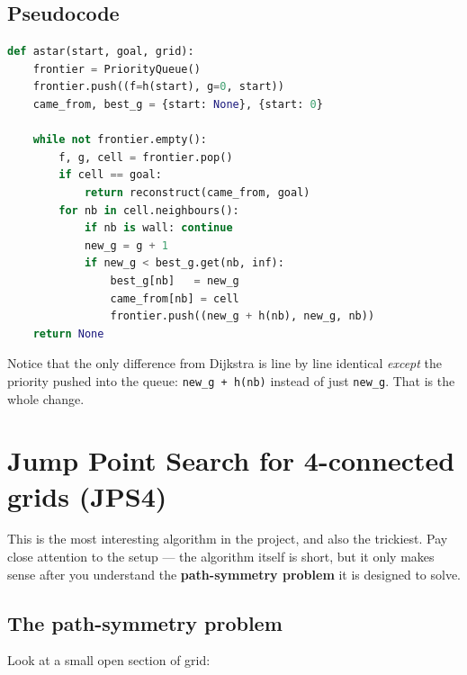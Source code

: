\documentclass[11pt,a4paper]{article}
\newcommand{\gridbase}[2]{%
  \draw[step=0.6,gray!50,very thin] (0,0) grid (#1*0.6,#2*0.6);
  \draw[black,thick] (0,0) rectangle (#1*0.6,#2*0.6);
}
\newcommand{\fillcell}[3]{%
  \fill[#3] (#1*0.6,#2*0.6) rectangle ({(#1+1)*0.6},{(#2+1)*0.6});
  \draw[gray!50,very thin] (#1*0.6,#2*0.6) rectangle ({(#1+1)*0.6},{(#2+1)*0.6});
}
\newcommand{\celltext}[3]{%
  \node at ({(#1+0.5)*0.6},{(#2+0.5)*0.6}) {\footnotesize #3};
}
\begin{document}
\subsection{Pseudocode}
\begin{lstlisting}[language=Python]
def astar(start, goal, grid):
    frontier = PriorityQueue()
    frontier.push((f=h(start), g=0, start))
    came_from, best_g = {start: None}, {start: 0}

    while not frontier.empty():
        f, g, cell = frontier.pop()
        if cell == goal:
            return reconstruct(came_from, goal)
        for nb in cell.neighbours():
            if nb is wall: continue
            new_g = g + 1
            if new_g < best_g.get(nb, inf):
                best_g[nb]   = new_g
                came_from[nb] = cell
                frontier.push((new_g + h(nb), new_g, nb))
    return None
\end{lstlisting}

Notice that the only difference from Dijkstra is line by line identical \emph{except} the priority pushed into the queue: \texttt{new\_g + h(nb)} instead of just \texttt{new\_g}. That is the whole change.

\clearpage
\section{Jump Point Search for 4-connected grids (JPS4)}\label{sec:jps}

This is the most interesting algorithm in the project, and also the trickiest. Pay close attention to the setup --- the algorithm itself is short, but it only makes sense after you understand the \textbf{path-symmetry problem} it is designed to solve.

\subsection{The path-symmetry problem}

Look at a small open section of grid:

\begin{center}
\end{center}
\end{document}
